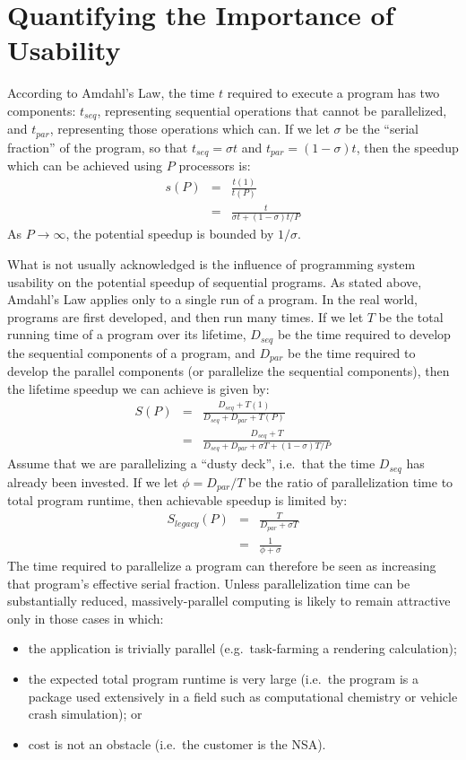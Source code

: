 \section{Quantifying the Importance of Usability\label{s:quant}}

According to Amdahl's Law,
the time $t$ required to execute a program has two components:
$t_{seq}$, representing sequential operations that cannot be parallelized,
and $t_{par}$, representing those operations which can.
If we let $\sigma$ be the ``serial fraction'' of the program,
so that $t_{seq} = {\sigma}t$ and $t_{par} = (1-{\sigma})t$,
then the speedup which can be achieved using $P$ processors is:
\begin{eqnarray*}
s(P)	& =	& \frac{t(1)}{t(P)}	\\
	& =	& \frac{t}{{{\sigma}t} + {{(1-{\sigma})t}}/{P}}
\end{eqnarray*}
As $P{\rightarrow}{\infty}$,
the potential speedup is bounded by $1/{\sigma}$.

What is not usually acknowledged is
the influence of programming system usability on
the potential speedup of sequential programs.
As stated above, Amdahl's Law applies only to a single run of a program.
In the real world, programs are first developed, and then run many times.
If we let $T$ be the total running time of a program over its lifetime,
$D_{seq}$ be the time required to develop the sequential components of a program,
and $D_{par}$ be the time required to develop the parallel components
(or parallelize the sequential components),
then the lifetime speedup we can achieve is given by:
\begin{eqnarray*}
S(P)	& =	& \frac{D_{seq} + T(1)}{D_{seq} + D_{par} + T(P)}	\\
	& =	& \frac{D_{seq} + T}{D_{seq} + D_{par} + {{\sigma}T} + {{(1-{\sigma})T}}/{P}}
\end{eqnarray*}
Assume that we are parallelizing a ``dusty deck'',
i.e.\ that the time $D_{seq}$ has already been invested.
If we let $\phi = D_{par}/T$ be the ratio of parallelization time to total program runtime,
then achievable speedup is limited by:
\begin{eqnarray*}
S_{legacy}(P)	& =	& \frac{T}{D_{par} + {\sigma}T}		\\
		& =	& \frac{1}{{\phi} + {\sigma}}
\end{eqnarray*}
The time required to parallelize a program can therefore be seen
as increasing that program's effective serial fraction.
Unless parallelization time can be substantially reduced,
massively-parallel computing is likely to remain attractive only in those cases in which:
\begin{itemize}
\item	the application is trivially parallel (e.g.\ task-farming a rendering calculation);
\item	the expected total program runtime is very large
	(i.e.\ the program is a package used extensively in a field
	such as computational chemistry or vehicle crash simulation);
	or
\item	cost is not an obstacle (i.e.\ the customer is the NSA).
\end{itemize}

